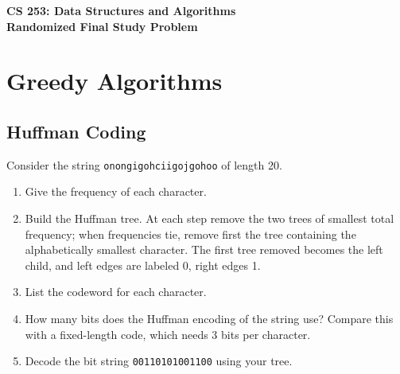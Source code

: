\documentclass[11pt]{article}
\begin{document}
\begin{center}
    \Large\textbf{CS 253: Data Structures and Algorithms}\\
    \large\textbf{Randomized Final Study Problem}
\end{center}
\vspace{1em}


\section*{Greedy Algorithms}
\subsection*{Huffman Coding}
Consider the string \texttt{onongigohciigojgohoo} of length 20.

\begin{enumerate}[label=(\alph*)]
  \item Give the frequency of each character.
  \item Build the Huffman tree. At each step remove the two trees of smallest total frequency; when frequencies tie, remove first the tree containing the alphabetically smallest character. The first tree removed becomes the left child, and left edges are labeled 0, right edges 1.
  \item List the codeword for each character.
  \item How many bits does the Huffman encoding of the string use? Compare this with a fixed-length code, which needs 3 bits per character.
  \item Decode the bit string \texttt{00110101001100} using your tree.
\end{enumerate}
\end{document}
